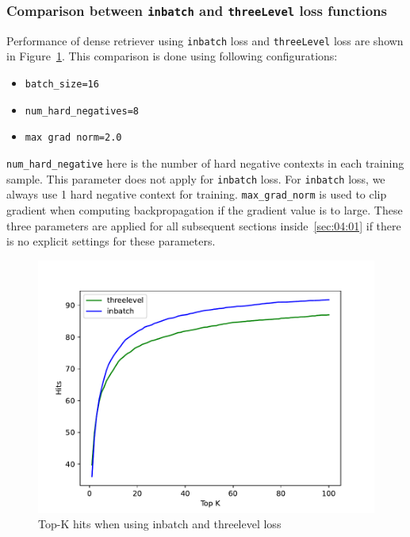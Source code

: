 \documentclass[3p, sort&compress, 12pt]{elsarticle}
\begin{document}
\subsubsection{Comparison between {\tt inbatch} and {\tt threeLevel} loss functions}
\label{sec:04:01:01}
Performance of dense retriever using {\tt inbatch} loss and {\tt threeLevel} loss are shown in Figure~\ref{fig:12}. This comparison is done using following configurations:
\begin{itemize}
	\item {\tt batch\_size=16}
	\item {\tt num\_hard\_negatives=8}
	\item {\tt max grad norm=2.0}
\end{itemize}
\par {\tt num\_hard\_negative} here is the number of hard negative contexts in each training sample. This parameter does not apply for {\tt inbatch} loss. For {\tt inbatch} loss, we always use 1 hard negative context for training. {\tt max\_grad\_norm} is used to clip gradient when computing backpropagation if the gradient value is to large. These three parameters are applied for all subsequent sections inside~\ref{sec:04:01} if there is no explicit settings for these parameters.
\begin{figure}[!htbp]
	\centering
	\includegraphics[scale=.7]{images/PDF/experiments/inbatch_threelevel_4-1-1.pdf}
	\caption{Top-K hits when using inbatch and threelevel loss}
	\label{fig:12}
\end{figure}
\end{document}
